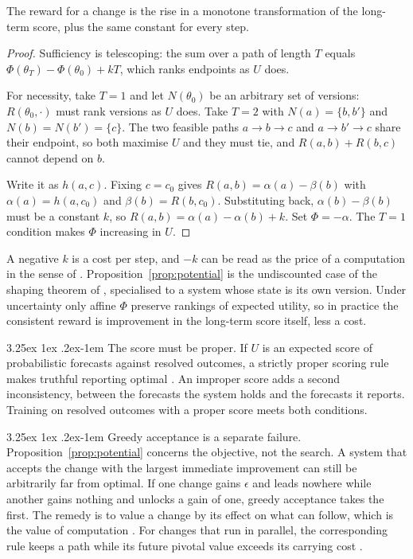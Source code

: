 \documentclass[11pt]{article}
\makeatletter
\renewcommand\paragraph{\@startsection{paragraph}{4}{\z@}%
  {3.25ex \@plus1ex \@minus.2ex}{-1em}%
  {\normalfont\normalsize\itshape}}
\theoremstyle{definition}
\theoremstyle{remark}
\makeatother
\begin{document}
The reward for a change is the rise in a monotone transformation of the long-term score, plus
the same constant for every step.

\begin{proof}
Sufficiency is telescoping: the sum over a path of length $T$ equals
$\Phi(\theta_T)-\Phi(\theta_0)+kT$, which ranks endpoints as $U$ does.

For necessity, take $T=1$
and let $N(\theta_0)$ be an arbitrary set of versions: $R(\theta_0,\cdot)$ must rank versions as
$U$ does. Take $T=2$ with $N(a)=\{b,b'\}$ and $N(b)=N(b')=\{c\}$. The two feasible paths
$a\to b\to c$ and $a\to b'\to c$ share their endpoint, so both maximise $U$ and they must tie, and $R(a,b)+R(b,c)$ cannot depend on
$b$.

Write it as $h(a,c)$. Fixing $c=c_0$ gives $R(a,b)=\alpha(a)-\beta(b)$ with
$\alpha(a)=h(a,c_0)$ and $\beta(b)=R(b,c_0)$. Substituting back, $\alpha(b)-\beta(b)$ must be a
constant $k$, so $R(a,b)=\alpha(a)-\alpha(b)+k$. Set $\Phi=-\alpha$. The $T=1$ condition makes
$\Phi$ increasing in $U$.
\end{proof}

A negative $k$ is a cost per step, and $-k$ can be read as the price of a computation in the
sense of \citet{russell1991metareasoning}. Proposition~\ref{prop:potential} is the undiscounted
case of the shaping theorem of \citet{ng1999shaping}, specialised to a system whose state is its
own version. Under uncertainty only affine $\Phi$ preserve rankings of expected utility, so in
practice the consistent reward is improvement in the long-term score itself, less a cost.

\paragraph{The score must be proper.} If $U$ is an expected score of probabilistic forecasts
against resolved outcomes, a strictly proper scoring rule makes truthful reporting optimal
\citep{brier1950verification,gneiting2007proper}. An improper score adds a second
inconsistency, between the forecasts the system holds and the forecasts it reports. Training on
resolved outcomes with a proper score \citep{turtel2026futureaslabel} meets both conditions.

\paragraph{Greedy acceptance is a separate failure.} Proposition~\ref{prop:potential} concerns
the objective, not the search. A system that accepts the change with the largest immediate
improvement can still be arbitrarily far from optimal. If one change gains $\epsilon$ and leads
nowhere while another gains nothing and unlocks a gain of one, greedy acceptance takes the
first. The remedy is to value a change by its effect on what can follow, which is the value of
computation \citep{russell1991metareasoning,hay2012selecting}. For changes that run in
parallel, the corresponding rule keeps a path while its future pivotal value exceeds its
carrying cost \citep{cotton2026wavefront}.
\end{document}
